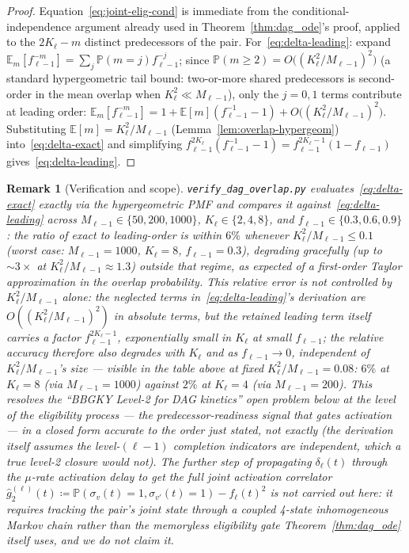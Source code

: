 \documentclass[11pt,a4paper]{report}
\newtheorem{remark}{Remark}[section]
\begin{document}
\begin{proof}
Equation~\eqref{eq:joint-elig-cond} is immediate from the
conditional-independence argument already used in
Theorem~\ref{thm:dag_ode}'s proof, applied to the $2K_\ell - m$
distinct predecessors of the pair. For~\eqref{eq:delta-leading}:
expand $\mathbb{E}_m[f_{\ell-1}^{-m}] = \sum_j \mathbb{P}(m=j)
f_{\ell-1}^{-j}$; since $\mathbb{P}(m\geq 2) =
O\bigl((K_\ell^2/M_{\ell-1})^2\bigr)$ (a standard hypergeometric tail
bound: two-or-more shared predecessors is second-order in the mean
overlap when $K_\ell^2 \ll M_{\ell-1}$), only the $j=0,1$ terms
contribute at leading order:
$\mathbb{E}_m[f_{\ell-1}^{-m}] = 1 + \mathbb{E}[m](f_{\ell-1}^{-1}-1) +
O\bigl((K_\ell^2/M_{\ell-1})^2\bigr)$. Substituting $\mathbb{E}[m] =
K_\ell^2/M_{\ell-1}$ (Lemma~\ref{lem:overlap-hypergeom})
into~\eqref{eq:delta-exact} and simplifying
$f_{\ell-1}^{2K_\ell}(f_{\ell-1}^{-1}-1) =
f_{\ell-1}^{2K_\ell-1}(1-f_{\ell-1})$ gives~\eqref{eq:delta-leading}.
\end{proof}

\begin{remark}[Verification and scope]
\texttt{verify\_dag\_overlap.py} evaluates~\eqref{eq:delta-exact}
exactly via the hypergeometric PMF and compares it
against~\eqref{eq:delta-leading} across $M_{\ell-1}\in\{50,200,1000\}$,
$K_\ell\in\{2,4,8\}$, and $f_{\ell-1}\in\{0.3,0.6,0.9\}$: the ratio of
exact to leading-order is within $6\%$ whenever $K_\ell^2/M_{\ell-1}
\leq 0.1$ (worst case: $M_{\ell-1}=1000$, $K_\ell=8$,
$f_{\ell-1}=0.3$), degrading gracefully (up to $\sim\!3\times$ at
$K_\ell^2/M_{\ell-1}\approx 1.3$) outside that regime, as expected of
a first-order Taylor approximation in the overlap probability. This
relative error is not controlled by $K_\ell^2/M_{\ell-1}$ alone: the
neglected terms in~\eqref{eq:delta-leading}'s derivation are
$O((K_\ell^2/M_{\ell-1})^2)$ in \emph{absolute} terms, but the
retained leading term itself carries a factor
$f_{\ell-1}^{2K_\ell-1}$, exponentially small in $K_\ell$ at small
$f_{\ell-1}$; the \emph{relative} accuracy therefore also degrades
with $K_\ell$ and as $f_{\ell-1}\to 0$, independent of
$K_\ell^2/M_{\ell-1}$'s size --- visible in the table above at fixed
$K_\ell^2/M_{\ell-1}=0.08$: $6\%$ at $K_\ell=8$ (via
$M_{\ell-1}=1000$) against $2\%$ at $K_\ell=4$ (via $M_{\ell-1}=200$).
This resolves the ``BBGKY Level-2 for DAG kinetics'' open problem below at
the level of the \emph{eligibility} process --- the predecessor-readiness
signal that gates activation --- in a closed form accurate to the order
just stated, not exactly (the derivation itself assumes the
level-$(\ell-1)$ completion indicators are independent, which a true
level-2 closure would not). The further step of
propagating
$\delta_\ell(t)$ through the $\mu$-rate activation delay to get the
full joint \emph{activation} correlator $\hat g_2^{(\ell)}(t)
\coloneqq \mathbb{P}(\sigma_v(t){=}1,\sigma_{v'}(t){=}1) -
f_\ell(t)^2$ is not carried out here: it requires tracking the pair's
joint state through a coupled 4-state inhomogeneous Markov chain
rather than the memoryless eligibility gate Theorem~\ref{thm:dag_ode}
itself uses, and we do not claim it.
\end{remark}
\end{document}
